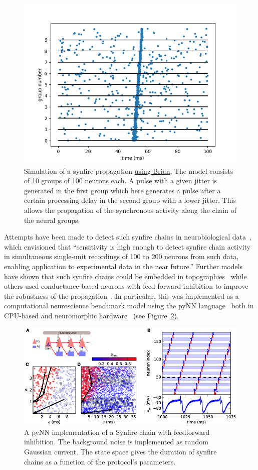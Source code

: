 \documentclass[brainsci, %
               review,submit,pdftex,moreauthors%
               ]{Definitions/mdpi}
\begin{document}
\begin{figure}
\centering
\includegraphics[width=.4\textwidth]{figures/Diesmann_et_al_1999.png}
\caption{Simulation of a synfire propagation \href{https://brian2.readthedocs.io/en/stable/examples/frompapers.Diesmann_et_al_1999.html}{using Brian}. The model consists of 10 groups of 100 neurons each. A pulse with a given jitter is generated in the first group which here generates a pulse after a certain processing delay in the second group with a lower jitter. This allows the propagation of the synchronous activity along the chain of the neural groups.}\label{fig:diesman}
\end{figure}
Attempts have been made to detect such synfire chains in neurobiological data~\citep{schrader_detecting_2008}, which envisioned that ``sensitivity is high enough to detect synfire chain activity in simultaneous single-unit recordings of 100 to 200 neurons from such data, enabling application to experimental data in the near future.'' Further models have shown that such synfire chains could be embedded in topographies~\citep{aviel_embedding_2003} while others used conductance-based neurons with feed-forward inhibition to improve the robustness of the propagation~\citep{kremkow_functional_2010}. In particular, this was implemented as a computational neuroscience benchmark model using the pyNN language~\citep{davison_pynn_2008} both in CPU-based and neuromorphic hardware~\citep{pfeil_six_2013} (see Figure~\ref{fig:pynn}).
%
\begin{figure}
\centering
\includegraphics[width=.7\textwidth]{figures/fnins-07-00011-g004.jpg}
\caption{A pyNN implementation of a Synfire chain with feedforward inhibition. The background noise  is implemented as random Gaussian current. The state space gives the duration of synfire chains as a function of the protocol's parameters.}\label{fig:pynn}
\end{figure}
\end{document}
